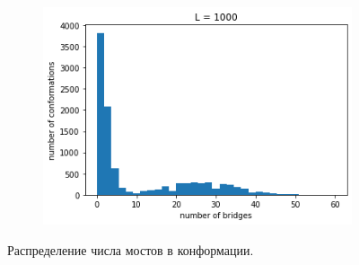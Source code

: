 \begin{figure}[H]
\begin{subfigure}[t]{0.3\textwidth}
		\includegraphics[width=\textwidth]{../images/bridges_count_L1000.png} 
	\end{subfigure}
	\caption{Распределение числа мостов в конформации.}
\end{figure}

